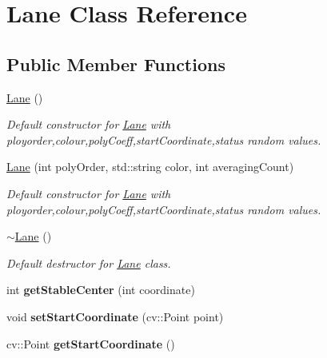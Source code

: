 \hypertarget{classLane}{}\section{Lane Class Reference}
\label{classLane}
\subsection*{Public Member Functions}
\begin{DoxyCompactItemize}
\item 
\hyperlink{classLane_affd642d537d96c03cb7fe8c8d46d37b4}{Lane} ()\hypertarget{classLane_affd642d537d96c03cb7fe8c8d46d37b4}{}\label{classLane_affd642d537d96c03cb7fe8c8d46d37b4}

\begin{DoxyCompactList}\small\item\em Default constructor for \hyperlink{classLane}{Lane} with ployorder,colour,poly\+Coeff,start\+Coordinate,status random values. \end{DoxyCompactList}\item 
\hyperlink{classLane_a7dac966c4a38ff5440e70b2be72aa5ac}{Lane} (int poly\+Order, std\+::string color, int averaging\+Count)
\begin{DoxyCompactList}\small\item\em Default constructor for \hyperlink{classLane}{Lane} with ployorder,colour,poly\+Coeff,start\+Coordinate,status random values. \end{DoxyCompactList}\item 
\hyperlink{classLane_a1c023c4eca02fb9a52365b7f6c04d7d4}{$\sim$\+Lane} ()\hypertarget{classLane_a1c023c4eca02fb9a52365b7f6c04d7d4}{}\label{classLane_a1c023c4eca02fb9a52365b7f6c04d7d4}

\begin{DoxyCompactList}\small\item\em Default destructor for \hyperlink{classLane}{Lane} class. \end{DoxyCompactList}\item 
int {\bfseries get\+Stable\+Center} (int coordinate)\hypertarget{classLane_a6e8a964eef75687d6c18d847e87dd938}{}\label{classLane_a6e8a964eef75687d6c18d847e87dd938}

\item 
void {\bfseries set\+Start\+Coordinate} (cv\+::\+Point point)\hypertarget{classLane_a33adbdc77bb6c4bcaaec18cfcc1ab3d2}{}\label{classLane_a33adbdc77bb6c4bcaaec18cfcc1ab3d2}

\item 
cv\+::\+Point {\bfseries get\+Start\+Coordinate} ()\hypertarget{classLane_adb05103858eddf69b9f9edcf667ae92e}{}\label{classLane_adb05103858eddf69b9f9edcf667ae92e}


\end{DoxyCompactItemize}
